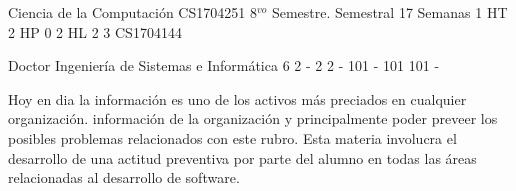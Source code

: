 \documentclass[a4paper,8pt]{article}
\begin{document}
\setNombreProfesor{}
\setGradoProfesorAbreviado{}
\sylabusHeader

\academicaTable
{Ciencia de la Computación} %
{CS1704251} %
{8$^{vo}$ Semestre.} %
{Semestral} %
{17 Semanas} %
{1 HT} %
{2 HP} %
{0} %
{2 HL}  %
{2} %
{3} %
{CS1704144} %

\administrativaTable
{Doctor} %
{Ingeniería de Sistemas e Informática} %
{6} %
{2} %
{-} %
{2} %
{2} %
{-} %
{101} %
{-} %
{101} %
{101} %
{-} %


\begin{fundamentacion}
Hoy en dia la información es uno de los activos más preciados en cualquier organización.
información de la organización y principalmente poder preveer los posibles problemas relacionados con este rubro.
Esta materia involucra el desarrollo de una actitud preventiva por parte del alumno en todas las áreas
relacionadas al desarrollo de software.

\end{fundamentacion}

\begin{sumilla}
\item \IASFoundationalConceptsinSecurity
\item \IASPrinciplesofSecureDesign
\item \IASDefensiveProgramming
\item \IASThreatsandAttacks
\item \IASNetworkSecurity
\item \IASCryptography
\item \IASWebSecurity
\item \IASPlatformSecurity
\item \IASDigitalForensics
\item \IASSecureSoftwareEngineering

\end{sumilla}
\end{document}
